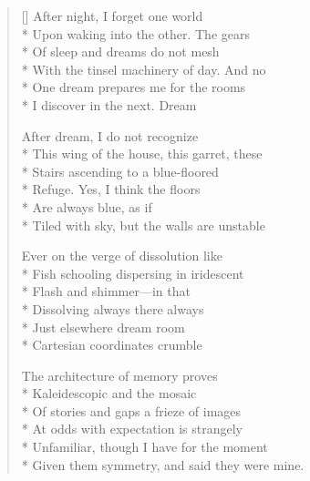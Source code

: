 \begin{verse}[\versewidth]
After night, I forget one world\\*
Upon waking into the other. The gears\\*
Of sleep and dreams do not mesh\\*
With the tinsel machinery of day.  And no\\*
One dream prepares me for the rooms\\*
I discover in the next. Dream

After dream, I do not recognize\\*
This wing of the house, this garret, these\\*
Stairs ascending to a blue-floored\\*
Refuge.  Yes, I think the floors\\*
Are always blue, as if\\*
Tiled with sky, but the walls are unstable

Ever on the verge of dissolution     like\\*
Fish   schooling   dispersing    in iridescent\\*
Flash and shimmer---in that\\*
Dissolving always there     always\\*
Just elsewhere dream room\\*
Cartesian coordinates crumble

The architecture of memory proves\\*
Kaleidescopic    and the mosaic\\*
Of stories and gaps    a frieze of images\\*
At odds with expectation     is strangely\\*
Unfamiliar, though I have for the moment\\*
Given them symmetry, and said they were mine.
\end{verse}

